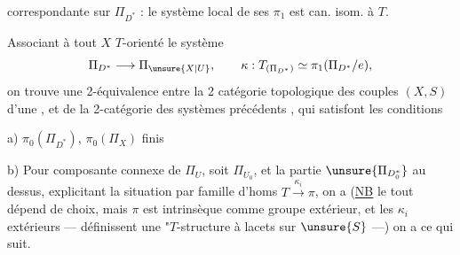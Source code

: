 

correspondante sur  \(\Pi_{D^*}\) : le système local de
ses \(\pi_1\) est can. isom. à \(T\).

Associant à tout \(X\) \(T\)-orienté le système
\[
\Pi_{D^*}\longrightarrow\Pi_{\unsure{X|U}},\qquad
\kappa:T_{(\Pi_{D^*})}\simeq\pi_1(\Pi_{D^*}/e),
\]
on trouve une 2-équivalence entre la 2 catégorie topologique des
 couples \((X,S)\) d'une
, et de la 2-catégorie des systèmes
précédents , \unsure{(}qui satisfont les conditions

a) \(\pi_0(\Pi_{D^*})\),  \(\pi_0(\Pi_X)\) finis

b) Pour  composante connexe de \(\Pi_U\), soit
\(\Pi_{U_0}\), et la partie \(\unsure{\Pi_{D_0^*}}\) au dessus, explicitant la
situation  par 
 famille d'homs
\(T\xrightarrow{\kappa_i}\pi\), on a (\uline{NB} le tout dépend de choix,
mais \(\pi\) est intrinsèque comme groupe extérieur, et les \(\kappa_i\)
 extérieurs --- définissent une "\(T\)-structure à lacets
sur \(\unsure{S}\) ---) on a ce qui suit.

